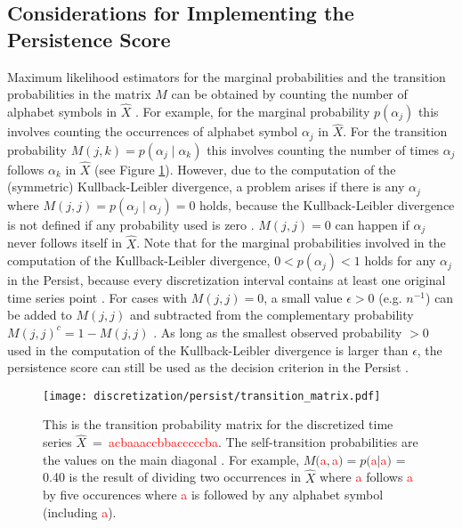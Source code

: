 \subsection*{Considerations for Implementing the Persistence Score}
Maximum likelihood estimators for the marginal probabilities and the transition probabilities in the matrix $M$ can be obtained by counting the number of alphabet symbols in $\hat{X}$ \cite{Persist}. For example, for the marginal probability $p(\alpha_j)$ this involves counting the occurrences of alphabet symbol $\alpha_j$ in $\hat{X}$. For the transition probability $M(j,k) = p(\alpha_j \mid \alpha_k)$ this involves counting the number of times $\alpha_j$ follows $\alpha_k$ in $\hat{X}$ (see Figure \ref{fig:transition_matrix}). \newline
However, due to the computation of the (symmetric) Kullback-Leibler divergence, a problem arises if there is any $\alpha_j$ where $M(j,j) = p(\alpha_j \mid \alpha_j) = 0$ holds, because the Kullback-Leibler divergence is not defined if any probability used is zero \cite{Persist}. $M(j,j) = 0$ can happen if $\alpha_j$ never follows itself in $\hat{X}$. Note that for the marginal probabilities involved in the computation of the Kullback-Leibler divergence,  $0 < p(\alpha_j) < 1$ holds for any $\alpha_j$ in the Persist, because every discretization interval contains at least one original time series point \cite{Persist}. \newline
For cases with $M(j,j) = 0$, a small value $\epsilon > 0$ (e.g. $n^{-1}$) can be added to $M(j,j)$ and subtracted from the complementary probability $M(j,j)^c = 1 - M(j,j)$ \cite{Persist}. As long as the smallest observed probability $> 0$ used in the computation of the Kullback-Leibler divergence is larger than $\epsilon$, the persistence score can still be used as the decision criterion in the Persist \cite{Persist}.
\begin{figure}[htb]
\centering
\texttt{[image: discretization/persist/transition\_matrix.pdf]}
\caption[Persist - Transition Probability Matrix]{This is the transition probability matrix for the discretized time series \mbox{$\hat{X}$ = \textcolor{red}{acbaaaccbbacccccba}}. The self-transition probabilities are the values on the main diagonal \cite{Persist}. For example, $M($\textcolor{red}{a}$,$\textcolor{red}{a}$) = p($\textcolor{red}{a}$\mid$\textcolor{red}{a}$)$ = 0.40 is the result of dividing two occurrences in $\hat{X}$ where \textcolor{red}{a} follows \textcolor{red}{a} by five occurences where \textcolor{red}{a} is followed by any alphabet symbol (including \textcolor{red}{a}).}
\label{fig:transition_matrix}
\end{figure}
